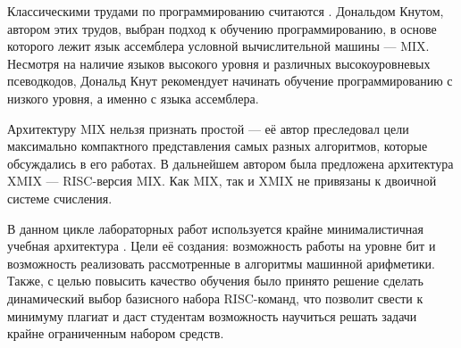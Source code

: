 Классическими трудами по программированию считаются \cite{bib:knuth:artOfProgramming1,bib:knuth:artOfProgramming2,bib:knuth:artOfProgramming3}. Дональдом Кнутом, автором этих трудов, выбран подход к обучению программированию, в основе которого лежит язык ассемблера условной вычислительной машины --- MIX. Несмотря на наличие языков высокого уровня и различных высокоуровневых псеводкодов, Дональд Кнут рекомендует начинать обучение программированию с низкого уровня, а именно с языка ассемблера.

Архитектуру MIX нельзя признать простой --- её автор преследовал цели максимально компактного представления самых разных алгоритмов, которые обсуждались в его работах. В дальнейшем автором была предложена архитектура XMIX --- RISC-версия MIX. Как MIX, так и XMIX не привязаны к двоичной системе счисления.

В данном цикле лабораторных работ используется крайне минималистичная учебная архитектура \MyProc. Цели её создания: возможность работы на уровне бит и возможность реализовать рассмотренные в \cite{bib:lisikov:automateBase,bib:saveliev:automateTheory,bib:fadeeva:vmbase,bib:fadeeva:addmul} алгоритмы машинной арифметики. Также, с целью повысить качество обучения было принято решение сделать динамический выбор базисного набора RISC-команд, что позволит свести к минимуму плагиат и даст студентам возможность научиться решать задачи крайне ограниченным набором средств.
    
